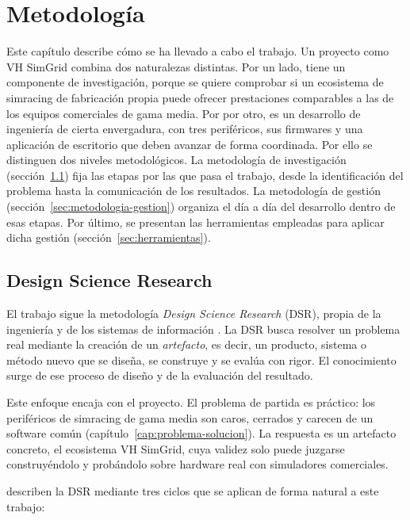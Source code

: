 \chapter{Metodología}
\label{cap:metodologia}

Este capítulo describe cómo se ha llevado a cabo el trabajo. Un proyecto como VH SimGrid combina dos naturalezas distintas. Por un lado, tiene un componente de investigación, porque se quiere comprobar si un ecosistema de simracing de fabricación propia puede ofrecer prestaciones comparables a las de los equipos comerciales de gama media. 
Por por otro, es un desarrollo de ingeniería de cierta envergadura, con tres periféricos, sus firmwares y una aplicación de escritorio que deben avanzar de forma coordinada. Por ello se distinguen dos niveles metodológicos. 
La metodología de investigación (sección~\ref{sec:metodologia-investigacion}) fija las etapas por las que pasa el trabajo, desde la identificación del problema hasta la comunicación de los resultados. La metodología de gestión (sección~\ref{sec:metodologia-gestion}) organiza el día a día del desarrollo dentro de esas etapas. Por último, se presentan las herramientas empleadas para aplicar dicha gestión (sección~\ref{sec:herramientas}).

\section{Design Science Research}
\label{sec:metodologia-investigacion}

El trabajo sigue la metodología \emph{Design Science Research} (DSR), propia de la ingeniería y de los sistemas de información \parencite{hevner_2004_dsr,peffers_2007_dsrm}. La DSR busca resolver un problema real mediante la creación de un \emph{artefacto}, es decir, un producto, sistema o método nuevo que se diseña, se construye y se evalúa con rigor. El conocimiento surge de ese proceso de diseño y de la evaluación del resultado.

Este enfoque encaja con el proyecto. El problema de partida es práctico: los periféricos de simracing de gama media son caros, cerrados y carecen de un software común (capítulo~\ref{cap:problema-solucion}). La respuesta es un artefacto concreto, el ecosistema VH SimGrid, cuya validez solo puede juzgarse construyéndolo y probándolo sobre hardware real con simuladores comerciales.

\Textcite{hevner_2004_dsr} describen la DSR mediante tres ciclos que se aplican de forma natural a este trabajo:


